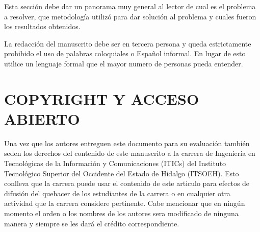 \documentclass{IEEEcsmag}
\begin{document}
Esta sección debe dar un panorama muy general al lector de cual es el problema a resolver, que metodología utilizó para dar solución al problema y cuales fueron los resultados obtenidos. 

La redacción del manuscrito debe ser en tercera persona y queda estrictamente prohibido el uso de palabras coloquiales o Español informal. En lugar de esto utilice un lenguaje formal que el mayor numero de personas pueda entender.

\section{COPYRIGHT Y ACCESO ABIERTO}

Una vez que los autores entreguen este documento para su evaluación también seden los derechos del contenido de este manuscrito a la carrera de Ingeniería en Tecnológicas de la Información y Comunicaciones (ITICs) del Instituto Tecnológico Superior del Occidente del Estado de Hidalgo (ITSOEH). Esto conlleva que la carrera puede usar el contenido de este articulo para efectos de difusión del quehacer de los estudiantes de la carrera o en cualquier otra actividad que la carrera considere pertinente. Cabe mencionar que en ningún momento el orden o los nombres de los autores sera modificado de ninguna manera y siempre se les dará el crédito correspondiente. 
\end{document}
